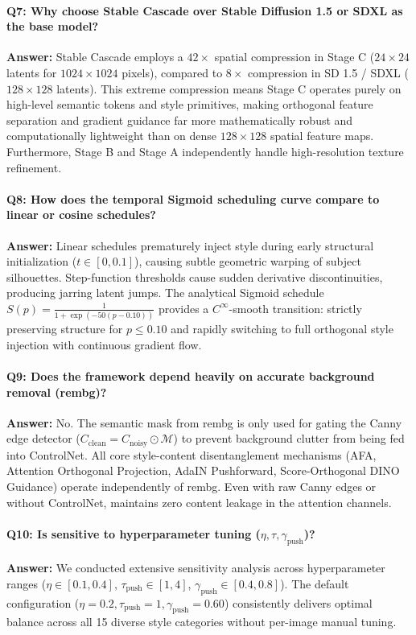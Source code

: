 \paragraph{Q7: Why choose Stable Cascade over Stable Diffusion 1.5 or SDXL as the base model?}
\textbf{Answer:} Stable Cascade employs a $42\times$ spatial compression in Stage C ($24 \times 24$ latents for $1024 \times 1024$ pixels), compared to $8\times$ compression in SD 1.5 / SDXL ($128 \times 128$ latents). This extreme compression means Stage C operates purely on high-level semantic tokens and style primitives, making orthogonal feature separation and gradient guidance far more mathematically robust and computationally lightweight than on dense $128 \times 128$ spatial feature maps. Furthermore, Stage B and Stage A independently handle high-resolution texture refinement.

\paragraph{Q8: How does the temporal Sigmoid scheduling curve compare to linear or cosine schedules?}
\textbf{Answer:} Linear schedules prematurely inject style during early structural initialization ($t \in [0, 0.1]$), causing subtle geometric warping of subject silhouettes. Step-function thresholds cause sudden derivative discontinuities, producing jarring latent jumps. The analytical Sigmoid schedule $S(p) = \frac{1}{1 + \exp(-50(p - 0.10))}$ provides a $C^\infty$-smooth transition: strictly preserving structure for $p \le 0.10$ and rapidly switching to full orthogonal style injection with continuous gradient flow.

\paragraph{Q9: Does the framework depend heavily on accurate background removal (rembg)?}
\textbf{Answer:} No. The semantic mask from rembg is only used for gating the Canny edge detector ($C_{\text{clean}} = C_{\text{noisy}} \odot \mathcal{M}$) to prevent background clutter from being fed into ControlNet. All core style-content disentanglement mechanisms (AFA, Attention Orthogonal Projection, AdaIN Pushforward, Score-Orthogonal DINO Guidance) operate independently of rembg. Even with raw Canny edges or without ControlNet, \method maintains zero content leakage in the attention channels.

\paragraph{Q10: Is \method sensitive to hyperparameter tuning ($\eta, \tau, \gamma_{\text{push}}$)?}
\textbf{Answer:} We conducted extensive sensitivity analysis across hyperparameter ranges ($\eta \in [0.1, 0.4]$, $\tau_{\text{push}} \in [1, 4]$, $\gamma_{\text{push}} \in [0.4, 0.8]$). The default configuration ($\eta = 0.2, \tau_{\text{push}} = 1, \gamma_{\text{push}} = 0.60$) consistently delivers optimal balance across all 15 diverse style categories without per-image manual tuning.

